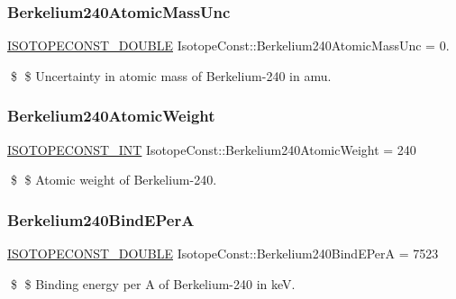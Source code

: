 \subsubsection{\texorpdfstring{Berkelium240\+Atomic\+Mass\+Unc}{Berkelium240AtomicMassUnc}}
{\footnotesize\ttfamily \mbox{\hyperlink{group___isotope_const-_macros_ga8f45a7272ce02c0b4c65c44636ed719a}{I\+S\+O\+T\+O\+P\+E\+C\+O\+N\+S\+T\+\_\+\+D\+O\+U\+B\+LE}} Isotope\+Const\+::\+Berkelium240\+Atomic\+Mass\+Unc = 0.}

\$ \$ Uncertainty in atomic mass of Berkelium-\/240 in amu. \mbox{\label{group___isotope_const-_berkelium-_bk240_ga5e41945eed276f3f81c7129ed103fbcd}} 
\subsubsection{\texorpdfstring{Berkelium240\+Atomic\+Weight}{Berkelium240AtomicWeight}}
{\footnotesize\ttfamily \mbox{\hyperlink{group___isotope_const-_macros_ga5f18360b3e99483a35c32d789e62621c}{I\+S\+O\+T\+O\+P\+E\+C\+O\+N\+S\+T\+\_\+\+I\+NT}} Isotope\+Const\+::\+Berkelium240\+Atomic\+Weight = 240}

\$ \$ Atomic weight of Berkelium-\/240. \mbox{\label{group___isotope_const-_berkelium-_bk240_ga49f006875794ed54300c04fc99c09d49}} 
\subsubsection{\texorpdfstring{Berkelium240\+Bind\+E\+PerA}{Berkelium240BindEPerA}}
{\footnotesize\ttfamily \mbox{\hyperlink{group___isotope_const-_macros_ga8f45a7272ce02c0b4c65c44636ed719a}{I\+S\+O\+T\+O\+P\+E\+C\+O\+N\+S\+T\+\_\+\+D\+O\+U\+B\+LE}} Isotope\+Const\+::\+Berkelium240\+Bind\+E\+PerA = 7523}

\$ \$ Binding energy per A of Berkelium-\/240 in keV. \mbox{\label{group___isotope_const-_berkelium-_bk240_gaf02f3eddd0ff18cbb2d1363da00c83a6}} 
